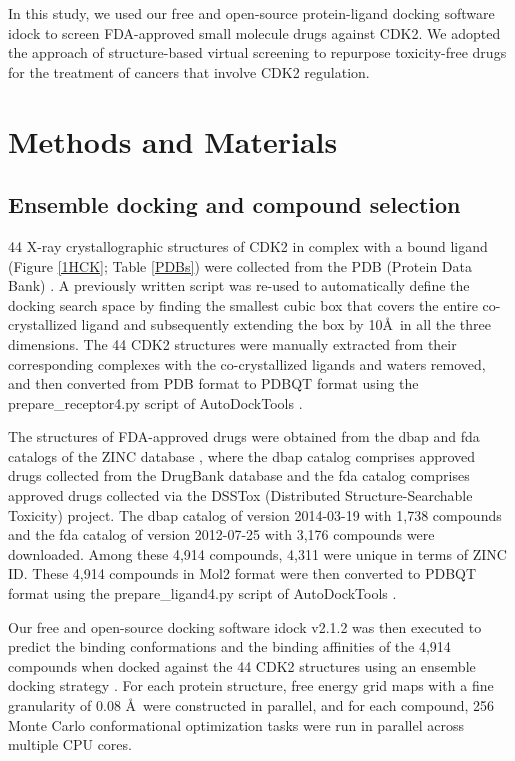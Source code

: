 \documentclass[10pt]{article}
\begin{document}
In this study, we used our free and open-source protein-ligand docking software idock \cite{1153,1362} to screen FDA-approved small molecule drugs against CDK2. We adopted the approach of structure-based virtual screening to repurpose toxicity-free drugs for the treatment of cancers that involve CDK2 regulation.

\section*{Methods and Materials}

\subsection*{Ensemble docking and compound selection}

44 X-ray crystallographic structures of CDK2 in complex with a bound ligand (Figure \ref{1HCK}; Table \ref{PDBs}) were collected from the PDB (Protein Data Bank) \cite{540,537}. A previously written script \cite{1362} was re-used to automatically define the docking search space by finding the smallest cubic box that covers the entire co-crystallized ligand and subsequently extending the box by 10\AA\ in all the three dimensions. The 44 CDK2 structures were manually extracted from their corresponding complexes with the co-crystallized ligands and waters removed, and then converted from PDB format to PDBQT format using the prepare\_receptor4.py script of AutoDockTools \cite{596}.

The structures of FDA-approved drugs were obtained from the dbap and fda catalogs of the ZINC database \cite{532,1178}, where the dbap catalog comprises approved drugs collected from the DrugBank database \cite{1594} and the fda catalog comprises approved drugs collected via the DSSTox (Distributed Structure-Searchable Toxicity) project. The dbap catalog of version 2014-03-19 with 1,738 compounds and the fda catalog of version 2012-07-25 with 3,176 compounds were downloaded. Among these 4,914 compounds, 4,311 were unique in terms of ZINC ID. These 4,914 compounds in Mol2 format were then converted to PDBQT format using the prepare\_ligand4.py script of AutoDockTools \cite{596}.

Our free and open-source docking software idock v2.1.2 \cite{1362} was then executed to predict the binding conformations and the binding affinities of the 4,914 compounds when docked against the 44 CDK2 structures using an ensemble docking strategy \cite{966,547,1128}. For each protein structure, free energy grid maps with a fine granularity of 0.08 \AA\ were constructed in parallel, and for each compound, 256 Monte Carlo conformational optimization tasks were run in parallel across multiple CPU cores.
\end{document}
